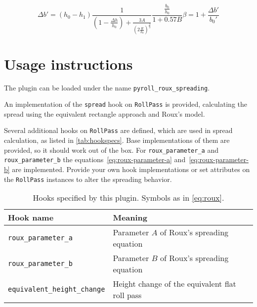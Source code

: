 \documentclass[11pt]{PyRollDocs}
\begin{document}
    \begin{subequations}
        \begin{equation}
            \Delta b' = \left( h_0 - h_1 \right) \frac{1}{\left( 1 - \frac{\Delta h}{h_0} \right) + \frac{3 A}{\left( 2 \frac{R}{h_0} \right)^{\frac{3}{4}}}} \frac{\frac{b_0}{h_0}}{1 + 0.57 B}
            \label{eq:delta-b}
        \end{equation}
        \begin{equation}
        \beta = 1 + \frac{\Delta b'}{b_0'}
        \label{eq:roux-reformulated}
    \end{equation}
    \end{subequations}

    \section{Usage instructions}\label{sec:usage-instructions}

    The plugin can be loaded under the name \texttt{pyroll\_roux\_spreading}.

    An implementation of the \lstinline{spread} hook on \lstinline{RollPass} is provided,
    calculating the spread using the equivalent rectangle approach and Roux's model.

    Several additional hooks on \lstinline{RollPass} are defined, which are used in spread calculation, as listed in \autoref{tab:hookspecs}.
    Base implementations of them are provided, so it should work out of the box.
    For \lstinline{roux_parameter_a} and \lstinline{roux_parameter_b} the equations~\ref{eq:roux-parameter-a} and~\ref{eq:roux-parameter-b} are implemented.
    Provide your own hook implementations or set attributes on the \lstinline{RollPass} instances to alter the spreading behavior.

    \begin{table}
        \centering
        \caption{Hooks specified by this plugin. Symbols as in \autoref{eq:roux}.}
        \label{tab:hookspecs}
        \begin{tabular}{ll}
            \toprule
            Hook name                   & Meaning                                    \\
            \midrule
            \texttt{roux\_parameter\_a} & Parameter $A$ of Roux's spreading equation \\
            \texttt{roux\_parameter\_b} & Parameter $B$ of Roux's spreading equation \\
            \texttt{equivalent\_height\_change} & Height change of the equivalent flat roll pass \\
            \bottomrule
        \end{tabular}
    \end{table}

    \printbibliography
\end{document}
